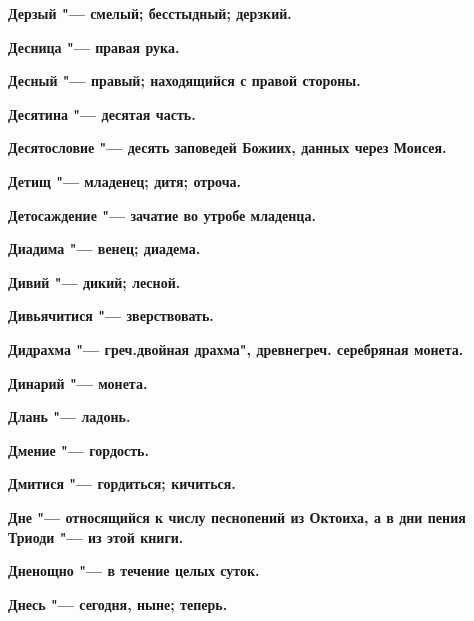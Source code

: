 \begin{mymulticols}{2}
\bfseries Дерзый\normalfont{} "--- смелый; бесстыдный; дерзкий. 




\bfseries Десница\normalfont{} "--- правая рука. 




\bfseries Десный\normalfont{} "--- правый; находящийся с правой стороны. 




\bfseries Десятина\normalfont{} "--- десятая часть. 




\bfseries Десятословие\normalfont{} "--- десять заповедей Божиих, данных через Моисея. 




\bfseries Детищ\normalfont{} "--- младенец; дитя; отроча. 




\bfseries Детосаждение\normalfont{} "--- зачатие во утробе младенца. 




\bfseries Диадима\normalfont{} "--- венец; диадема. 




\bfseries Дивий\normalfont{} "--- дикий; лесной. 




\bfseries Дивьячитися\normalfont{} "--- зверствовать. 




\bfseries Дидрахма\normalfont{} "--- греч.двойная драхма", древнегреч. серебряная монета. 




\bfseries Динарий\normalfont{} "--- монета. 




\bfseries Длань\normalfont{} "--- ладонь. 




\bfseries Дмение\normalfont{} "--- гордость. 




\bfseries Дмитися\normalfont{} "--- гордиться; кичиться. 




\bfseries Дне\normalfont{} "--- относящийся к числу песнопений из Октоиха, а в дни пения Триоди "--- из этой книги. 




\bfseries Дненощно\normalfont{} "--- в течение целых суток. 




\bfseries Днесь\normalfont{} "--- сегодня, ныне; теперь. 





\end{mymulticols}
